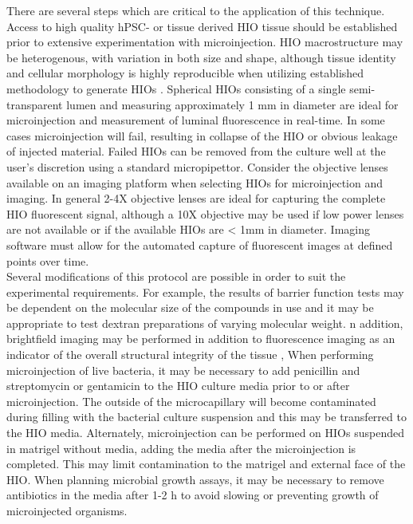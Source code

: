 \documentclass[11pt]{article}
\begin{document}
There are several steps which are critical to the application of this technique. Access to high quality hPSC- or tissue derived HIO tissue should be established prior to extensive experimentation with microinjection. HIO macrostructure may be heterogenous, with variation in both size and shape, although tissue identity and cellular morphology is highly reproducible when utilizing established methodology to generate HIOs \supercite{McCracken:2011}. Spherical HIOs consisting of a single semi-transparent lumen and measuring approximately 1 mm in diameter are ideal for microinjection and measurement of luminal fluorescence in real-time. In some cases microinjection will fail, resulting in collapse of the HIO or obvious leakage of injected material. Failed HIOs can be removed from the culture well at the user's discretion using a standard micropipettor. Consider the objective lenses available on an imaging platform when selecting HIOs for microinjection and imaging. In general 2-4X objective lenses are ideal for capturing the complete HIO fluorescent signal, although a 10X objective may be used if low power lenses are not available or if the available HIOs are < 1mm in diameter. Imaging software must allow for the automated capture of fluorescent images at defined points over time.\\

Several modifications of this protocol are possible in order to suit the experimental requirements. For example, the results of barrier function tests may be dependent on the molecular size of the compounds in use \supercite{Vojdani:2013} and it may be appropriate to test dextran preparations of varying molecular weight. n addition, brightfield imaging may be performed in addition to fluorescence  imaging as an indicator of the overall structural integrity of the tissue \supercite{Leslie:2015}, When performing microinjection of live bacteria\supercite{Hill:2017,Leslie:2015,Forbester:2015,Engevik:2015,Engevik:2013,Karve:2017}, it may be necessary to add penicillin and streptomycin or gentamicin to the HIO culture media prior to or after microinjection. The outside of the microcapillary will become contaminated during filling with the bacterial culture suspension and this may be transferred to the HIO media. Alternately, microinjection can be performed on HIOs suspended in matrigel without media, adding the media after the microinjection is completed. This may limit contamination to the matrigel and external face of the HIO. When planning microbial growth assays, it may be necessary to remove antibiotics in the media after 1-2 h to avoid slowing or preventing growth of microinjected organisms.\\
\end{document}
